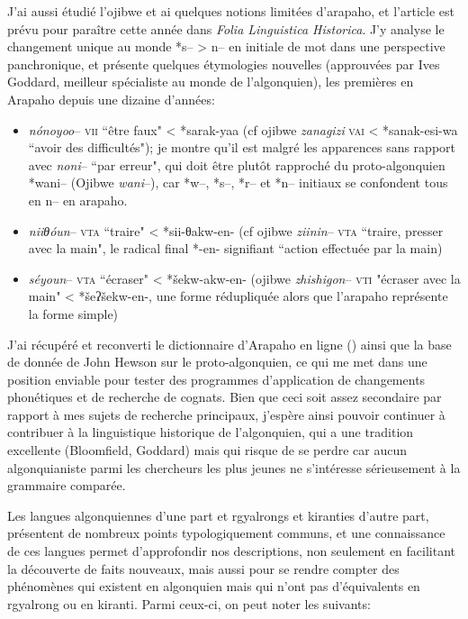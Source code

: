 \documentclass[oldfontcommands,oneside,a4paper,11pt]{memoir}
\begin{document}
J'ai aussi étudié l'ojibwe et ai quelques notions limitées d'arapaho, et l'article \citet{jacques13arapaho} est prévu pour paraître cette année dans \textit{Folia Linguistica Historica}. J'y analyse le changement unique au monde *s-- > n-- en initiale de mot dans une perspective panchronique, et présente quelques étymologies nouvelles (approuvées par Ives Goddard, meilleur spécialiste au monde de l'algonquien), les premières en Arapaho depuis une dizaine d'années:
\begin{itemize}
\item  \textit{nónoyoo}-- \textsc{vii} ``être faux" < *sarak-yaa (cf ojibwe \textit{zanagizi} \textsc{vai} < *sanak-esi-wa ``avoir des difficultés"); je montre qu'il est malgré les apparences sans rapport avec \textit{noni}-- ``par erreur", qui doit être plutôt rapproché du proto-algonquien *wani-- (Ojibwe \textit{wani}--), car *w--, *s--, *r-- et *n-- initiaux se confondent tous en n-- en arapaho.

\item  \textit{niiθóun}-- \textsc{vta} ``traire" < *sii-θakw-en- (cf ojibwe \textit{ziinin}-- \textsc{vta} ``traire, presser avec la main", le radical final *-en- signifiant ``action effectuée par la main)

\item \textit{séyoun}-- \textsc{vta} ``écraser" < *šekw-akw-en- (ojibwe \textit{zhishigon}-- \textsc{vti} "écraser avec la main" < *šeʔšekw-en-, une forme rédupliquée alors que l'arapaho représente la forme simple)

\end{itemize}
J'ai récupéré et  reconverti le dictionnaire d'Arapaho en ligne (\citealt{conathan06arapaho}) ainsi que la base de donnée de John Hewson sur le proto-algonquien, ce qui me met dans une position enviable pour tester des programmes d'application de changements phonétiques et de recherche de cognats. Bien que ceci soit assez secondaire par rapport à mes sujets de recherche principaux, j'espère ainsi pouvoir continuer à contribuer à la linguistique historique de l'algonquien, qui a une tradition excellente (Bloomfield, Goddard) mais qui risque de se perdre car aucun algonquianiste parmi les chercheurs les plus jeunes ne s'intéresse sérieusement à la grammaire comparée.


Les langues algonquiennes d'une part et rgyalrongs et kiranties d'autre part, présentent de nombreux points typologiquement communs, et une connaissance de ces langues permet d'approfondir nos descriptions, non seulement en facilitant la découverte de faits nouveaux, mais aussi pour se rendre compter des phénomènes qui existent en algonquien mais qui n'ont pas d'équivalents en rgyalrong ou en kiranti. Parmi ceux-ci, on peut noter les suivants:
\end{document}
